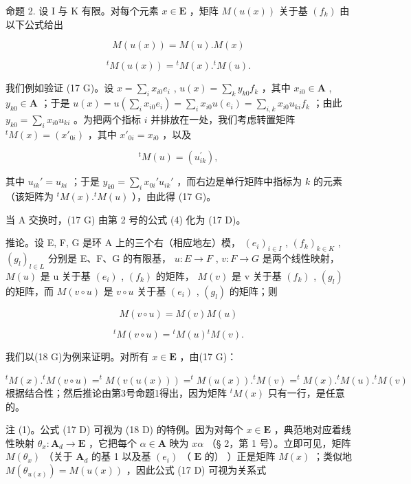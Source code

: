命题 2. 设 I 与 K 有限。对每个元素 \(x \in \mathbf{E}\) ，矩阵 \(M(u(x))\) 关于基 \((f_k)\) 由以下公式给出

\[
M (u (x)) = M (u). M (x)\tag{17 D}
\]

\[
{ } ^ { t } M ( u ( x ) ) = { } ^ { t } M ( x ) . { } ^ { t } M ( u ) .\tag{17 G}
\]

我们例如验证 (17 G)。设 \(x = \sum_{i} x_{i0} e_i\) , \(u(x) = \sum_{k} y_{k0} f_k\) ，其中 \(x_{i0} \in \mathbf{A}\) , \(y_{k0} \in \mathbf{A}\) ；于是 \(u(x) = u\left(\sum_{i} x_{i0} e_i\right) = \sum_{i} x_{i0} u(e_i) = \sum_{i, k} x_{i0} u_{ki} f_k\) ；由此 \(y_{k0} = \sum_{i} x_{i0} u_{ki}\) 。为把两个指标 \(i\) 并排放在一处，我们考虑转置矩阵 \(^t M(x) = (x'_{0i})\) ，其中 \(x'_{0i} = x_{i0}\) ，以及

\[
{ } ^ { t } M ( u ) = \left( u _ { i k } ^ { \prime } \right) ,
\]

其中 \(u_{ik}' = u_{ki}\) ；于是 \(y_{k0} = \sum_{i} x_{0i}' u_{ik}'\) ，而右边是单行矩阵中指标为 \(k\) 的元素（该矩阵为 \(^t M(x).^t M(u)\) ），由此得 (17 G)。

当 A 交换时，(17 G) 由第 2 号的公式 (4) 化为 (17 D)。

推论。设 E, F, G 是环 A 上的三个右（相应地左）模， \((e_{i})_{i\in I}\) , \((f_{k})_{k\in K}\) , \((g_{l})_{l\in L}\) 分别是 E、F、G 的有限基， \(u:E\to F\) , \(v:F\to G\) 是两个线性映射， \(M(u)\) 是 u 关于基 \((e_{i})\) , \((f_{k})\) 的矩阵， \(M(v)\) 是 v 关于基 \((f_{k})\) , \((g_{l})\) 的矩阵，而 \(M(v\circ u)\) 是 \(v\circ u\) 关于基 \((e_{i})\) , \((g_{l})\) 的矩阵；则

\[
M (v \circ u) = M (v) M (u)\tag{18 D}
\]

\[
{ } ^ { t } M ( v \circ u ) = { } ^ { t } M ( u ) { } ^ { t } M ( v ) .\tag{18 G}
\]

我们以(18 G)为例来证明。对所有 \(x \in \mathbf{E}\) ，由(17 G)：

\(^{t}M(x).^{t}M(v\circ u)=^{t}M(v(u(x)))=^{t}M(u(x)).^{t}M(v)=^{t}M(x).^{t}M(u).^{t}M(v)\) 根据结合性；然后推论由第3号命题1得出，因为矩阵 \(^{t}M(x)\) 只有一行，是任意的。

注 (1)。公式 (17 D) 可视为 (18 D) 的特例。因为对每个 \(x \in \mathbf{E}\) ，典范地对应着线性映射 \(\theta_x: \mathbf{A}_d \to \mathbf{E}\) ，它把每个 \(\alpha \in \mathbf{A}\) 映为 \(x\alpha\) （§ 2，第 1 号）。立即可见，矩阵 \(M(\theta_x)\) （关于 \(\mathbf{A}_d\) 的基 1 以及基 \((e_i)\) （ \(\mathbf{E}\) 的） ）正是矩阵 \(M(x)\) ；类似地 \(M(\theta_{u(x)}) = M(u(x))\) ，因此公式 (17 D) 可视为关系式

